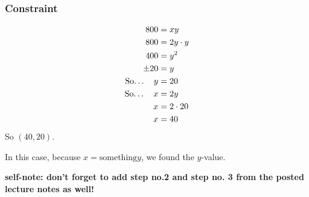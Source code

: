 \documentclass{article}
\begin{document}
\begin{examplebox}
\begin{solutionbox}
        \subsubsection*{Constraint}
        \begin{align*}
            800 &= xy \\
            800 &= 2y \cdot y \\
            400 &= y^2 \\
            \pm 20 &= y \\
            \text{So\dots} \quad y &= 20 \\
            \text{So\dots} \quad x &= 2y \\
            x &= 2 \cdot 20 \\
            x &= 40
        \end{align*}
        So \( (40, 20) \).

        In this case, because \( x = \text{something}y \), we found the \( y \)-value.

        \textbf{self-note: don't forget to add step no.2 and step no. 3 from the posted lecture notes as well!}
    \end{solutionbox}
\end{examplebox}

\newpage  %
\end{document}
